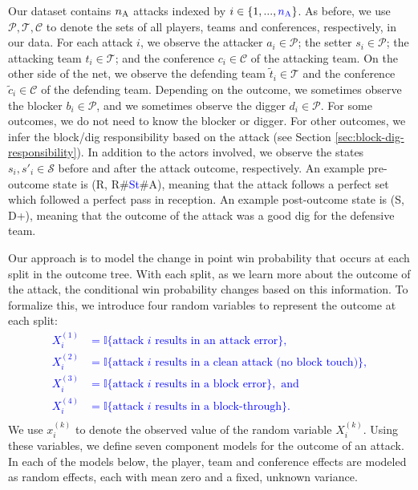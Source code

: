 \documentclass[USenglish]{article}
\theoremstyle{dgthm}
\theoremstyle{dgdef}
\begin{document}
Our dataset contains \textcolor{blue}{$n_{\mbox{\scriptsize A}}$} attacks indexed by $i \in \{1, ..., \textcolor{blue}{n_{\mbox{\scriptsize A}}}\}$. As before, we use $\mathcal{P}, \mathcal{T}, \mathcal{C}$ to denote the sets of all players, teams and conferences, respectively, in our data. For each attack $i$, we observe the attacker $a_i \in \mathcal{P}$; the setter $s_i \in \mathcal{P}$; the attacking team $t_i \in \mathcal{T}$; and the conference $c_i \in \mathcal{C}$ of the attacking team. On the other side of the net, we observe the defending team $\tilde t_i \in \mathcal{T}$ and the conference $\tilde c_i \in \mathcal C$ of the defending team. Depending on the outcome, we sometimes observe the blocker $b_i \in \mathcal{P}$, and we sometimes observe the digger $d_i \in \mathcal{P}$. For some outcomes, we do not need to know the blocker or digger. For other outcomes, we infer the block/dig responsibility based on the attack (see Section \ref{sec:block-dig-responsibility}). In addition to the actors involved, we observe the states $s_i, s'_i \in \mathcal{S}$ before and after the attack outcome, respectively. An example pre-outcome state is (R, R\#\textcolor{blue}{St}\#A), meaning that the attack follows a perfect set which followed a perfect pass in reception. An example post-outcome state is (S, D+), meaning that the outcome of the attack was a good dig for the defensive team.

Our approach is to model the change in point win probability that occurs at each split in the outcome tree. With each split, as we learn more about the outcome of the attack, the conditional win probability changes based on this information. To formalize this, we introduce four random variables to represent the outcome at each split:
\textcolor{blue}{
\begin{align*}
    X_i^{(1)} &= \mathbb{I}\{\mbox{attack $i$ results in an attack error}\},\\
    X_i^{(2)} &= \mathbb{I}\{\mbox{attack $i$ results in a clean attack (no block touch)}\},\\
    X_i^{(3)} &= \mathbb{I}\{\mbox{attack $i$ results in a block error}\},\mbox{ and}\\
    X_i^{(4)} &= \mathbb{I}\{\mbox{attack $i$ results in a block-through}\}.\\
\end{align*}
}
We use $x_i^{(k)}$ to denote the observed value of the random variable $X_i^{(k)}$. Using these variables, we define seven component models for the outcome of an attack. In each of the models below, the player, team and conference effects are modeled as random effects, each with mean zero and a fixed, unknown variance.\\
\end{document}
